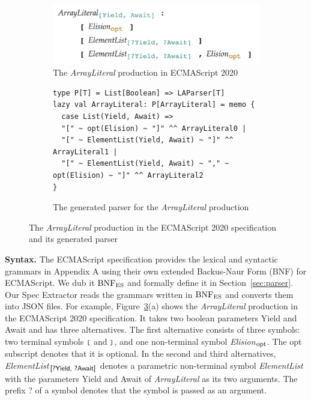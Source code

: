 \begin{figure}
  \centering
  \begin{subfigure}[t]{0.4\textwidth}
    \includegraphics[width=\textwidth]{img/array_literal.png}
    \caption{The \textit{ArrayLiteral} production in ECMAScript 2020}
    \label{fig:array-literal-es}
  \end{subfigure}
  \begin{subfigure}[t]{0.46\textwidth}
    \begin{lstlisting}[style=myScalastyle]
type P[T] = List[Boolean] => LAParser[T]
lazy val ArrayLiteral: P[ArrayLiteral] = memo {
  case List(Yield, Await) =>
  "[" ~ opt(Elision) ~ "]" ^^ ArrayLiteral0 |
  "[" ~ ElementList(Yield, Await) ~ "]" ^^ ArrayLiteral1 |
  "[" ~ ElementList(Yield, Await) ~ "," ~ opt(Elision) ~ "]" ^^ ArrayLiteral2
}
    \end{lstlisting}
    \caption{The generated parser for the \textit{ArrayLiteral} production}
    \label{fig:array-literal-parser}
  \end{subfigure}
  \caption{The \textit{ArrayLiteral} production in the ECMAScript 2020 specification and its generated parser}
  \label{fig:array-literal}
\end{figure}

\smallskip

\textbf{Syntax.} The ECMAScript specification provides the lexical and
syntactic grammars in Appendix A using their own extended Backus-Naur
Form (BNF) for ECMAScript.  We dub it \( \text{BNF}_{\text{ES}} \) and formally define
it in Section~\ref{sec:parser}.  Our {\sf Spec Extractor} reads the
grammars written in \( \text{BNF}_{\text{ES}} \) and converts them into JSON files.
For example, Figure~\ref{fig:array-literal}(a) shows the
\textit{ArrayLiteral} production in the ECMAScript 2020
specification.  It takes two boolean parameters \textsf{Yield} and
\textsf{Await} and has three alternatives.  The first alternative
consists of three symbols: two terminal symbols \( \texttt{\footnotesize[} \) and
\( \texttt{\footnotesize]} \), and one non-terminal symbol \textit{Elision}$_{\mbox{\footnotesize opt}}$.
The {\small opt} subscript denotes that it is optional.  In the second
and third alternatives, \textit{ElementList}$_{\mbox{\footnotesize\sf [?Yield, ?Await]}}$
denotes a parametric non-terminal symbol \textit{ElementList}
with the parameters \textsf{Yield} and \textsf{Await} of
\textit{ArrayLiteral} as its two arguments. The prefix \textsf{\small ?}
of a symbol denotes that the symbol is passed as an argument.

